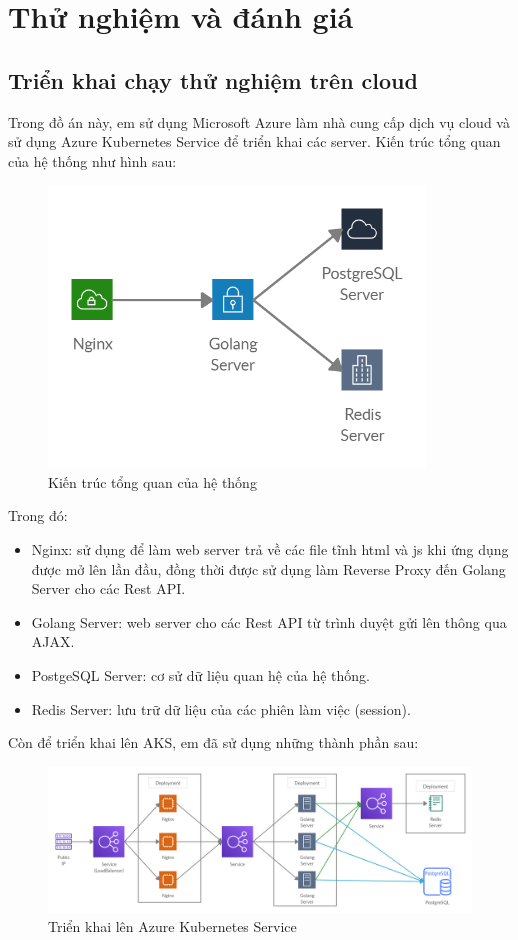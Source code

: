 \chapter{Thử nghiệm và đánh giá}
\section{Triển khai chạy thử nghiệm trên cloud}
Trong đồ án này, em sử dụng Microsoft Azure làm nhà cung cấp dịch vụ
cloud và sử dụng Azure Kubernetes Service để triển khai các server.
Kiến trúc tổng quan của hệ thống như hình sau:
\begin{figure}[H]
\centering
\includegraphics[width=10cm]{images/architecture.png}
\caption{Kiến trúc tổng quan của hệ thống}
\end{figure}
Trong đó:
\begin{itemize}[topsep=0ex]
\item Nginx: sử dụng để làm web server trả về các file tĩnh html và js khi
ứng dụng được mở lên lần đầu, đồng thời được sử dụng làm Reverse Proxy đến
Golang Server cho các Rest API.

\item Golang Server: web server cho các Rest API từ trình duyệt gửi lên
thông qua AJAX.

\item PostgeSQL Server: cơ sử dữ liệu quan hệ của hệ thống.

\item Redis Server: lưu trữ dữ liệu của các phiên làm việc (session).
\end{itemize}

Còn để triển khai lên AKS, em đã sử dụng những thành phần sau:
\begin{figure}[H]
\centering
\includegraphics[width=\textwidth]{images/deploy.png}
\caption{Triển khai lên Azure Kubernetes Service}
\end{figure}

